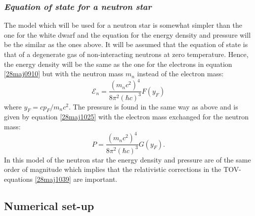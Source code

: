 \documentclass[twocolumn]{article}
\begin{document}
\begin{large}
\subsubsection*{\textit{Equation of state for a neutron star}}
The model which will be used for a neutron star is somewhat simpler than the one for the white dwarf and the equation for the energy density and pressure will be the similar as the ones above. It will be assumed that the equation of state is that of a degenerate gas of non-interacting neutrons at zero temperature. Hence, the energy density will be the same as the one for the electrons in equation \eqref{28maj0910} but with the neutron mass $m_n$ instead of the electron mass:
\begin{equation}
    \mathcal{E}_n = \frac{(m_nc^2)^4}{8\pi^2(\hbar c)^3}F(y_F)
\end{equation}
where $y_F = cp_F/m_nc^2$. The pressure is found in the same way as above and is given by equation \eqref{28maj1025} with the electron mass exchanged for the neutron mass:
\begin{equation}
    P = \frac{(m_nc^2)^4}{8\pi^2(\hbar c)^3}G(y_F).
\end{equation}
In this model of the neutron star the energy density and pressure are of the same order of magnitude which implies that the relativistic corrections in the TOV-equations \eqref{28maj1039} are important.



\subsection*{Numerical set-up}

\end{large}
\end{document}
